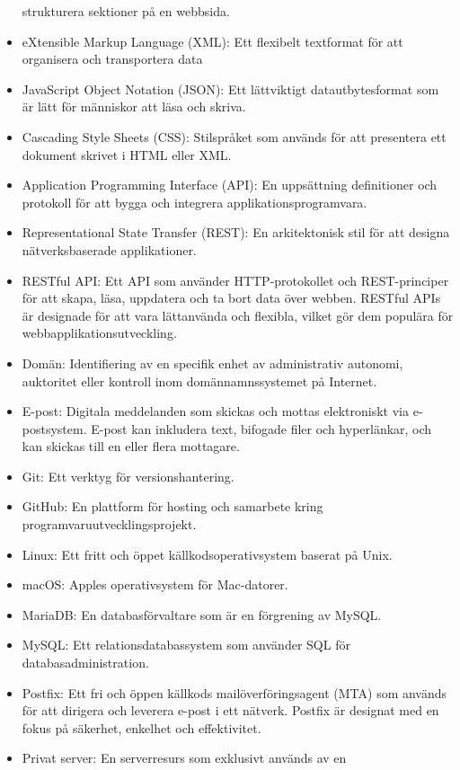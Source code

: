 \begin{itemize}
    strukturera sektioner på en webbsida.
    \item eXtensible Markup Language (XML): Ett flexibelt textformat för att
    organisera och transportera data
    \item JavaScript Object Notation (JSON): Ett lättviktigt datautbytesformat
    som är lätt för människor att läsa och skriva.
    \item Cascading Style Sheets (CSS): Stilspråket som används för att
    presentera ett dokument skrivet i HTML eller XML.
    \item Application Programming Interface (API): En uppsättning definitioner
    och protokoll för att bygga och integrera applikationsprogramvara.
    \item Representational State Transfer (REST): En arkitektonisk stil för
    att designa nätverksbaserade applikationer.
    \item RESTful API: Ett API som använder HTTP-protokollet och REST-principer
    för att skapa, läsa, uppdatera och ta bort data över webben. RESTful APIs
    är designade för att vara lättanvända och flexibla, vilket gör dem populära
    för webbapplikationsutveckling.
    \item Domän: Identifiering av en specifik enhet av administrativ autonomi,
    auktoritet eller kontroll inom domännamnssystemet på Internet.
    \item E-post: Digitala meddelanden som skickas och mottas elektroniskt via
    e-postsystem. E-post kan inkludera text, bifogade filer och hyperlänkar,
    och kan skickas till en eller flera mottagare.
    \item Git: Ett verktyg för versionshantering.
    \item GitHub: En plattform för hosting och samarbete kring
    programvaruutvecklingsprojekt.
    \item Linux: Ett fritt och öppet källkodsoperativsystem baserat på
    Unix.
    \item macOS: Apples operativsystem för Mac-datorer.
    \item MariaDB: En databasförvaltare som är en förgrening av MySQL.
    \item MySQL: Ett relationsdatabassystem som använder SQL för
    databasadministration.
    \item Postfix: Ett fri och öppen källkods mailöverföringsagent (MTA) som
    används för att dirigera och leverera e-post i ett nätverk. Postfix är
    designat med en fokus på säkerhet, enkelhet och effektivitet.
    \item Privat server: En serverresurs som exklusivt används av en

\end{itemize}
